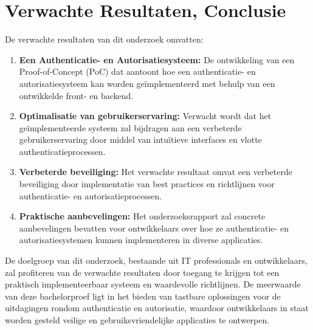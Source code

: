 \section{Verwachte Resultaten, Conclusie}%
\label{sec:verwachte_resultaten}

De verwachte resultaten van dit onderzoek omvatten:

\begin{enumerate}
    \item \textbf{Een Authenticatie- en Autorisatiesysteem:} 
    De ontwikkeling van een Proof-of-Concept (PoC) dat aantoont hoe een authenticatie- en autorisatiesysteem kan worden geïmplementeerd met 
    behulp van een ontwikkelde front- en backend.

    \item \textbf{Optimalisatie van gebruikerservaring:} 
    Verwacht wordt dat het geïmplementeerde systeem zal bijdragen aan een verbeterde gebruikerservaring door middel van intuïtieve interfaces en 
    vlotte authenticatieprocessen.

    \item \textbf{Verbeterde beveiliging:} 
    Het verwachte resultaat omvat een verbeterde beveiliging door implementatie van best practices en richtlijnen voor authenticatie- en 
    autorisatieprocessen.

    \item \textbf{Praktische aanbevelingen:}
    Het onderzoeksrapport zal concrete aanbevelingen bevatten voor ontwikkelaars over hoe ze authenticatie- en autorisatiesystemen kunnen 
    implementeren in diverse applicaties.
\end{enumerate}

De doelgroep van dit onderzoek, bestaande uit IT professionals en ontwikkelaars, zal profiteren van de verwachte resultaten door toegang te krijgen 
tot een praktisch implementeerbaar systeem en waardevolle richtlijnen. De meerwaarde van deze bachelorproef ligt in het bieden van tastbare 
oplossingen voor de uitdagingen rondom authenticatie en autorisatie, waardoor ontwikkelaars in staat worden gesteld veilige en gebruiksvriendelijke 
applicaties te ontwerpen.
